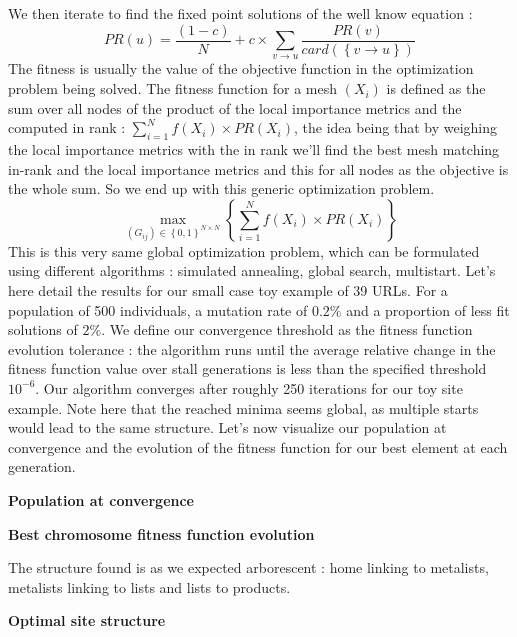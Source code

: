 \documentclass{iSWAGArticle}
\begin{document}
We then iterate to find the fixed point solutions of the well know equation :
\begin{equation}
PR\left(u\right)= \frac{\left(1-c\right)}{N} + c \times \sum_{v \rightarrow u}\frac{PR\left(v\right)}{card\left(\left\{v\rightarrow u\right\}\right)}
\end{equation}
The fitness is usually the value of the objective function in the optimization problem being solved.
The fitness function for a mesh $\left(X_i\right)$ is defined as the sum over all nodes of the product of the local importance metrics
and the computed in rank : $\sum^{N}_{i=1} f\left(X_i\right)\times PR(X_i)$, the idea being that by weighing the local importance metrics with the in rank
we'll find the best mesh matching in-rank and the local importance metrics and this for all nodes as the objective is the whole sum. 
So we end up with this generic optimization problem.
\begin{equation}
\max_{\left(G_{ij}\right)  \in \left\{0,1\right\}^{N\times N}}\left\{ \sum^{N}_{i=1} f\left(X_i\right)\times PR(X_i)\right\}
\end{equation}
This is this very same global optimization problem, which can be formulated using different algorithms : simulated annealing, global search, multistart.
Let's here detail the results for our small case toy example of 39 URLs.
For a population of 500 individuals, a mutation rate of $0.2 \%$ and a proportion of less fit solutions of $2\%$.
We define our convergence threshold as the fitness function evolution tolerance : the algorithm runs until the average relative change in the fitness function value over stall generations is less than the specified 
threshold $10^{-6}$.
Our algorithm converges after roughly 250 iterations for our toy site example. Note here that the reached minima seems global, as multiple starts
would lead to the same structure.
Let's now visualize our population at convergence and the evolution of the fitness function for our best element at each generation.
\begin{center}
\textbf{\large Population at convergence}
\end{center}
\begin{center}
\end{center}
\begin{center}
\textbf{\large Best chromosome fitness function evolution}
\end{center}
\begin{center}
\end{center}
The structure found is as we expected arborescent : home linking to metalists, metalists linking to lists and lists to products.
\begin{center}
\textbf{\large Optimal site structure}
\end{center}
\begin{center}
\end{center}
\end{document}
